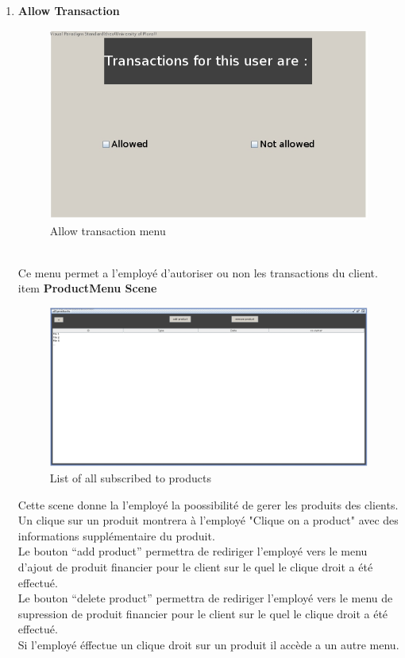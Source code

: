 \documentclass[../rapport.tex]{subfiles}
\begin{document}
\begin{enumerate}
\item \textbf{Allow Transaction} \\
		\begin{figure}[h!]
				\centering \includegraphics[scale=0.2]{ressources/photos_diagrammes/app2/gui/allowTransactions.jpg}
				\caption{Allow transaction menu}
		\end{figure}
		\\
Ce menu permet a l'employé d'autoriser ou non les transactions du client.\\

\newpage
item \textbf{ProductMenu Scene} \\
		\begin{figure}[h!]
				\centering \includegraphics[scale=0.2]{ressources/photos_diagrammes/app2/gui/productsMenuScene.jpg}
				\caption{List of all subscribed to products}
		\end{figure}

Cette scene donne la l'employé la poossibilité de gerer les produits des clients.\\
Un clique sur un produit montrera à l'employé "Clique on a product" avec des informations supplémentaire du produit.\\
Le bouton ``add product'' permettra de rediriger l'employé vers le menu d'ajout de produit financier pour le client sur le quel le clique droit a été effectué.\\
Le bouton ``delete product'' permettra de rediriger l'employé vers le menu de supression de produit financier pour le client sur le quel le clique droit a été effectué.\\
Si l'employé éffectue un clique droit sur un produit il accède a un autre menu.\\


\end{enumerate}
\end{document}
